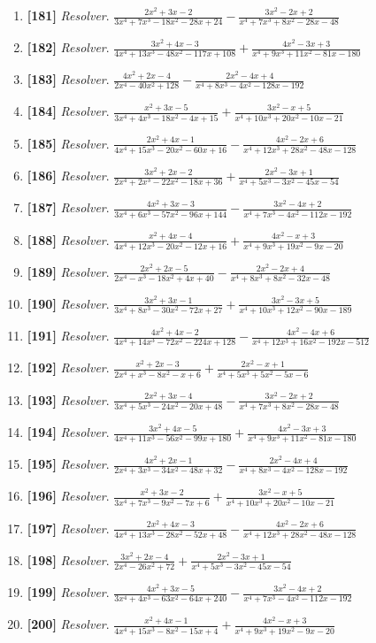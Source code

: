 \documentclass[11pt,a4paper]{article}
\newcommand{\ejercicio}[3]{\item \textbf{[#1]} \textit{#2}. $ #3 $}
\begin{document}
\begin{enumerate}
\ejercicio{181}{Resolver}{\frac{2 x^{2} + 3 x - 2}{3 x^{4} + 7 x^{3} - 18 x^{2} - 28 x + 24} - \frac{3 x^{2} - 2 x + 2}{x^{4} + 7 x^{3} + 8 x^{2} - 28 x - 48}}
\ejercicio{182}{Resolver}{\frac{3 x^{2} + 4 x - 3}{4 x^{4} + 13 x^{3} - 48 x^{2} - 117 x + 108} + \frac{4 x^{2} - 3 x + 3}{x^{4} + 9 x^{3} + 11 x^{2} - 81 x - 180}}
\ejercicio{183}{Resolver}{\frac{4 x^{2} + 2 x - 4}{2 x^{4} - 40 x^{2} + 128} - \frac{2 x^{2} - 4 x + 4}{x^{4} + 8 x^{3} - 4 x^{2} - 128 x - 192}}
\ejercicio{184}{Resolver}{\frac{x^{2} + 3 x - 5}{3 x^{4} + 4 x^{3} - 18 x^{2} - 4 x + 15} + \frac{3 x^{2} - x + 5}{x^{4} + 10 x^{3} + 20 x^{2} - 10 x - 21}}
\ejercicio{185}{Resolver}{\frac{2 x^{2} + 4 x - 1}{4 x^{4} + 15 x^{3} - 20 x^{2} - 60 x + 16} - \frac{4 x^{2} - 2 x + 6}{x^{4} + 12 x^{3} + 28 x^{2} - 48 x - 128}}
\ejercicio{186}{Resolver}{\frac{3 x^{2} + 2 x - 2}{2 x^{4} + 2 x^{3} - 22 x^{2} - 18 x + 36} + \frac{2 x^{2} - 3 x + 1}{x^{4} + 5 x^{3} - 3 x^{2} - 45 x - 54}}
\ejercicio{187}{Resolver}{\frac{4 x^{2} + 3 x - 3}{3 x^{4} + 6 x^{3} - 57 x^{2} - 96 x + 144} - \frac{3 x^{2} - 4 x + 2}{x^{4} + 7 x^{3} - 4 x^{2} - 112 x - 192}}
\ejercicio{188}{Resolver}{\frac{x^{2} + 4 x - 4}{4 x^{4} + 12 x^{3} - 20 x^{2} - 12 x + 16} + \frac{4 x^{2} - x + 3}{x^{4} + 9 x^{3} + 19 x^{2} - 9 x - 20}}
\ejercicio{189}{Resolver}{\frac{2 x^{2} + 2 x - 5}{2 x^{4} - x^{3} - 18 x^{2} + 4 x + 40} - \frac{2 x^{2} - 2 x + 4}{x^{4} + 8 x^{3} + 8 x^{2} - 32 x - 48}}
\ejercicio{190}{Resolver}{\frac{3 x^{2} + 3 x - 1}{3 x^{4} + 8 x^{3} - 30 x^{2} - 72 x + 27} + \frac{3 x^{2} - 3 x + 5}{x^{4} + 10 x^{3} + 12 x^{2} - 90 x - 189}}
\ejercicio{191}{Resolver}{\frac{4 x^{2} + 4 x - 2}{4 x^{4} + 14 x^{3} - 72 x^{2} - 224 x + 128} - \frac{4 x^{2} - 4 x + 6}{x^{4} + 12 x^{3} + 16 x^{2} - 192 x - 512}}
\ejercicio{192}{Resolver}{\frac{x^{2} + 2 x - 3}{2 x^{4} + x^{3} - 8 x^{2} - x + 6} + \frac{2 x^{2} - x + 1}{x^{4} + 5 x^{3} + 5 x^{2} - 5 x - 6}}
\ejercicio{193}{Resolver}{\frac{2 x^{2} + 3 x - 4}{3 x^{4} + 5 x^{3} - 24 x^{2} - 20 x + 48} - \frac{3 x^{2} - 2 x + 2}{x^{4} + 7 x^{3} + 8 x^{2} - 28 x - 48}}
\ejercicio{194}{Resolver}{\frac{3 x^{2} + 4 x - 5}{4 x^{4} + 11 x^{3} - 56 x^{2} - 99 x + 180} + \frac{4 x^{2} - 3 x + 3}{x^{4} + 9 x^{3} + 11 x^{2} - 81 x - 180}}
\ejercicio{195}{Resolver}{\frac{4 x^{2} + 2 x - 1}{2 x^{4} + 3 x^{3} - 34 x^{2} - 48 x + 32} - \frac{2 x^{2} - 4 x + 4}{x^{4} + 8 x^{3} - 4 x^{2} - 128 x - 192}}
\ejercicio{196}{Resolver}{\frac{x^{2} + 3 x - 2}{3 x^{4} + 7 x^{3} - 9 x^{2} - 7 x + 6} + \frac{3 x^{2} - x + 5}{x^{4} + 10 x^{3} + 20 x^{2} - 10 x - 21}}
\ejercicio{197}{Resolver}{\frac{2 x^{2} + 4 x - 3}{4 x^{4} + 13 x^{3} - 28 x^{2} - 52 x + 48} - \frac{4 x^{2} - 2 x + 6}{x^{4} + 12 x^{3} + 28 x^{2} - 48 x - 128}}
\ejercicio{198}{Resolver}{\frac{3 x^{2} + 2 x - 4}{2 x^{4} - 26 x^{2} + 72} + \frac{2 x^{2} - 3 x + 1}{x^{4} + 5 x^{3} - 3 x^{2} - 45 x - 54}}
\ejercicio{199}{Resolver}{\frac{4 x^{2} + 3 x - 5}{3 x^{4} + 4 x^{3} - 63 x^{2} - 64 x + 240} - \frac{3 x^{2} - 4 x + 2}{x^{4} + 7 x^{3} - 4 x^{2} - 112 x - 192}}
\ejercicio{200}{Resolver}{\frac{x^{2} + 4 x - 1}{4 x^{4} + 15 x^{3} - 8 x^{2} - 15 x + 4} + \frac{4 x^{2} - x + 3}{x^{4} + 9 x^{3} + 19 x^{2} - 9 x - 20}}
\end{enumerate}
\end{document}
